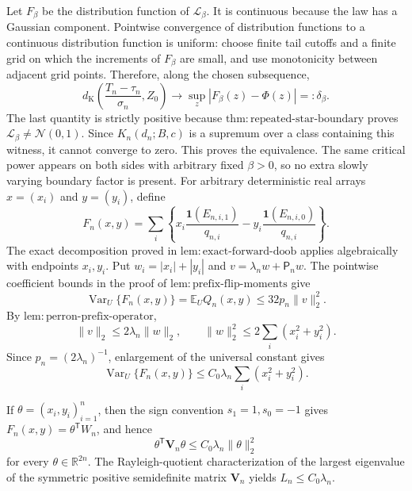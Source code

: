 Let \(F_\beta\) be the distribution function of \(\mathcal L_\beta\).  It is continuous because the law has a Gaussian component.  Pointwise convergence of distribution functions to a continuous distribution function is uniform: choose finite tail cutoffs and a finite grid on which the increments of \(F_\beta\) are small, and use monotonicity between adjacent grid points.  Therefore, along the chosen subsequence,
\[
 d_{\mathrm K}\left(\frac{T_n-\tau_n}{\sigma_n},Z_0\right)
 \longrightarrow \sup_z|F_\beta(z)-\Phi(z)|=:\delta_\beta.
\]
The last quantity is strictly positive because \(\mathrm{thm:repeated\text{-}star\text{-}boundary}\) proves \(\mathcal L_\beta\ne\mathcal N(0,1)\).  Since \(K_n(d_n;B,c)\) is a supremum over a class containing this witness, it cannot converge to zero.  This proves the equivalence.  The same critical power appears on both sides with arbitrary fixed \(\beta>0\), so no extra slowly varying boundary factor is present.
For arbitrary deterministic real arrays \(x=(x_i)\) and \(y=(y_i)\), define
\[
 F_n(x,y)=\sum_i\left\{x_i\frac{\mathbf1(E_{n,i,1})}{q_{n,i}}
 -y_i\frac{\mathbf1(E_{n,i,0})}{q_{n,i}}\right\}.
\]
The exact decomposition proved in \(\mathrm{lem:exact\text{-}forward\text{-}doob}\) applies algebraically with endpoints \(x_i,y_i\).  Put \(w_i=|x_i|+|y_i|\) and \(v=\lambda_nw+\mathsf P_nw\).  The pointwise coefficient bounds in the proof of \(\mathrm{lem:prefix\text{-}flip\text{-}moments}\) give
\[
 \operatorname{Var}_U\{F_n(x,y)\}=\mathbb E_UQ_n(x,y)
 \le32p_n\|v\|_2^2.
\]
By \(\mathrm{lem:perron\text{-}prefix\text{-}operator}\),
\[
 \|v\|_2\le2\lambda_n\|w\|_2,\qquad
 \|w\|_2^2\le2\sum_i(x_i^2+y_i^2).
\]
Since \(p_n=(2\lambda_n)^{-1}\), enlargement of the universal constant gives
\[
 \operatorname{Var}_U\{F_n(x,y)\}
 \le C_0\lambda_n\sum_i(x_i^2+y_i^2).
\]

If \(\theta=(x_i,y_i)_{i=1}^n\), then the sign convention \(s_1=1,s_0=-1\) gives \(F_n(x,y)=\theta^{\mathsf T}W_n\), and hence
\[
 \theta^{\mathsf T}\mathbf V_n\theta\le C_0\lambda_n\|\theta\|_2^2
\]
for every \(\theta\in\mathbb R^{2n}\).  The Rayleigh-quotient characterization of the largest eigenvalue of the symmetric positive semidefinite matrix \(\mathbf V_n\) yields \(L_n\le C_0\lambda_n\).

